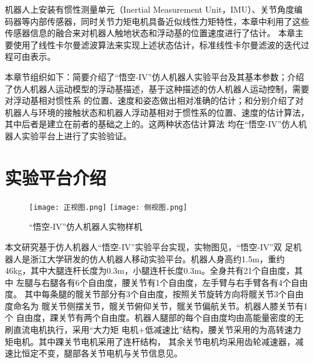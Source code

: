 机器人上安装有惯性测量单元（Inertial Measurement Unit，IMU）、关节角度编码器等内部传感器，同时关节力矩电机具备近似线性力矩特性，本章中利用了这些传感器信息的融合来对机器人触地状态和浮动基的位置速度进行了估计。
本章主要使用了线性卡尔曼滤波算法来实现上述状态估计，标准线性卡尔曼滤波的迭代过程可由表示。

本章节组织如下：简要介绍了“悟空-IV”仿人机器人实验平台及其基本参数；介绍了仿人机器人运动模型的浮动基描述，基于这种描述的仿人机器人运动控制，需要对浮动基相对惯性系
的位置、速度和姿态做出相对准确的估计；和分别介绍了对机器人与环境的接触状态和机器人浮动基相对于惯性系的位置、速度的估计算法，其中后者是建立在前者的基础之上的。这两种状态估计算法
均在“悟空-IV”仿人机器人实验平台上进行了实验验证。
\section{实验平台介绍}
\label{sec:exp_platform}
\begin{figure}[htbp]
    \centering
        {%
            \texttt{[image: 正视图.png]}}
        {%
            \texttt{[image: 侧视图.png]}}
    \caption{“悟空-IV”仿人机器人实物样机\label{fig:wukong_pic}}
\end{figure}
本文研究基于仿人机器人“悟空-IV”实验平台实现，实物图见，“悟空-IV”双
足机器人是浙江大学研发的仿人机器人移动实验平台。机器人身高约1.5m，重约
46kg，其中大腿连杆长度为0.3m，小腿连杆长度0.3m。全身共有21个自由度，其中
左腿与右腿各有6个自由度，腰关节有1个自由度，左手臂与右手臂各有4个自由度。
其中每条腿的髋关节部分有3个自由度，按照关节旋转方向将髋关节3个自由度命名为
髋关节侧摆关节，髋关节俯仰关节，髋关节偏航关节。机器人膝关节有1个
自由度，踝关节有两个自由度。机器人腿部的每个自由度均由高能量密度的无刷直流电机执行，采用“大力矩
电机+低减速比”结构，腰关节采用的为高转速力矩电机。其中踝关节电机采用了连杆结构，
其余关节电机均采用齿轮减速器，减速比恒定不变，腿部各关节电机与关节信息见。
